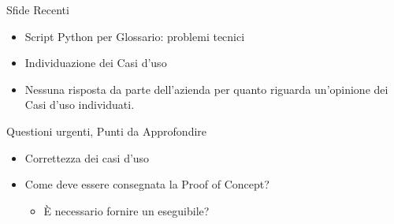 \documentclass{beamer}
\begin{document}
\begin{frame}
    \begin{alertblock}{Sfide Recenti}
        \begin{itemize}
            \item Script Python per Glossario: problemi tecnici
            \item Individuazione dei Casi d'uso 
            \item Nessuna risposta da parte dell'azienda per quanto riguarda un'opinione dei Casi d'uso individuati.
        \end{itemize}
    \end{alertblock}
\end{frame}

\begin{frame}
    \begin{exampleblock}{Questioni urgenti, Punti da Approfondire}
        \begin{itemize}
            \item Correttezza dei casi d'uso
            \item Come deve essere consegnata la Proof of Concept?
            \begin{itemize}
                \item È necessario fornire un eseguibile?
            \end{itemize}
        \end{itemize}
    \end{exampleblock}
\end{frame}
\end{document}
